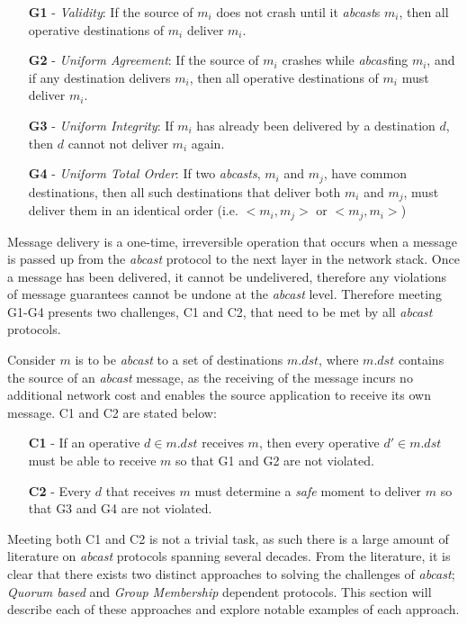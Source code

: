 \begin{itemize}
    \item [\textbf{G1}] - \emph{Validity}: If the source of $m_i$ does not crash until it \emph{abcast}s $m_i$, then all operative destinations of $m_i$ deliver $m_i$.
    \item [\textbf{G2}] - \emph{Uniform Agreement}: If the source of $m_i$ crashes while \emph{abcast}ing $m_i$, and if any destination delivers $m_i$, then all operative
destinations of $m_i$ must deliver $m_i$.
    \item [\textbf{G3}] - \emph{Uniform Integrity}: If $m_i$ has already been delivered by a destination $d$, then $d$ cannot not deliver $m_i$ again.  
    \item [\textbf{G4}] - \emph{Uniform Total Order}: If two \emph{\emph{abcast}s}, $m_i$ and $m_j$, have
common destinations, then all such destinations that deliver both $m_i$ and $m_j$, must deliver them in an identical order (i.e. $<m_i, m_j>$ or $<m_j, m_i>$)
\end{itemize}

Message delivery is a one-time, irreversible operation that occurs when a message is passed up from the \emph{abcast} protocol to the next layer in the network stack. Once a message has been delivered, it cannot be undelivered, therefore any violations of message guarantees cannot be undone at the \emph{abcast} level.  Therefore meeting G1-G4 presents two challenges, C1 and C2, that need to be met by all \emph{abcast} protocols.

Consider $m$ is to be \emph{abcast} to a set of destinations $m.dst$, where $m.dst$ contains the source of an \emph{abcast} message, as the receiving of the message incurs no additional network cost and enables the source application to receive its own message.  C1 and C2 are stated below:
\begin{itemize}
    \item[\textbf{C1}] - If an operative $d \in m.dst$ receives $m$, then every operative
     $d' \in m.dst$ must be able to receive $m$ so that G1 and G2 are not violated.
    \item[\textbf{C2}] - Every $d$ that receives $m$ must determine a \emph{safe} moment
to deliver $m$ so that G3 and G4 are not violated.
\end{itemize}

Meeting both C1 and C2 is not a trivial task, as such there is a large amount of literature\cite{Defago:2004:TOB:1041680.1041682} on \emph{abcast} protocols spanning several decades.  From the literature, it is clear that there exists two distinct approaches to solving the challenges of \emph{abcast}; \emph{Quorum based} and \emph{Group Membership} dependent protocols.  This section will describe each of these approaches and explore notable examples of each approach.  
	
